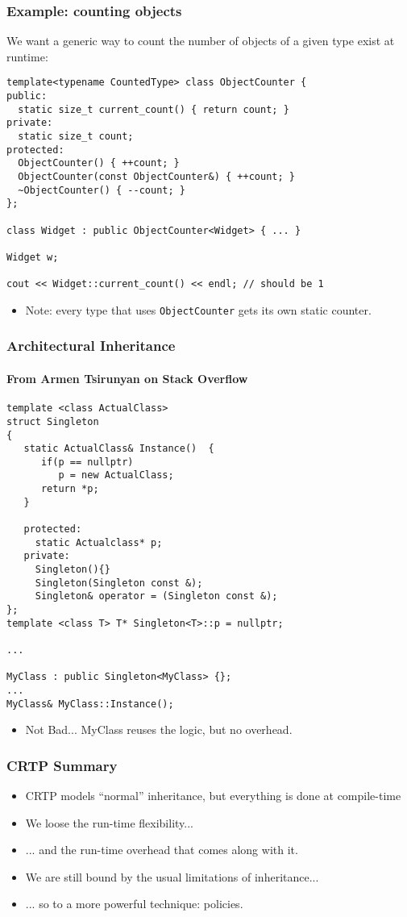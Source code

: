 \begin{frame}[fragile,t]
\frametitle{Example: counting objects}
We want a generic way to count the number of objects of a given type
exist at runtime:
{\scriptsize\begin{verbatim}
template<typename CountedType> class ObjectCounter {
public:
  static size_t current_count() { return count; }
private:
  static size_t count;
protected:
  ObjectCounter() { ++count; }
  ObjectCounter(const ObjectCounter&) { ++count; }
  ~ObjectCounter() { --count; }
};

class Widget : public ObjectCounter<Widget> { ... }

Widget w;

cout << Widget::current_count() << endl; // should be 1

\end{verbatim}
}
\begin{itemize}[<+->]
\item Note: every type that uses \texttt{ObjectCounter} gets its own
  static counter.
\end{itemize}
\end{frame}


\begin{frame}[fragile,t]
\frametitle{Architectural Inheritance}
\framesubtitle{From Armen Tsirunyan on Stack Overflow}
{\scriptsize\begin{verbatim}
template <class ActualClass> 
struct Singleton
{
   static ActualClass& Instance()  {
      if(p == nullptr)
         p = new ActualClass;
      return *p; 
   }

   protected:
     static Actualclass* p;
   private:
     Singleton(){}
     Singleton(Singleton const &);
     Singleton& operator = (Singleton const &); 
};
template <class T> T* Singleton<T>::p = nullptr;

...

MyClass : public Singleton<MyClass> {};
...
MyClass& MyClass::Instance();
\end{verbatim}
}
\begin{itemize}[<+->]
\item Not Bad... MyClass reuses the logic, but no overhead.
\end{itemize}

\end{frame}

\begin{frame}[fragile,t]
\frametitle{CRTP Summary}
\begin{itemize}[<+->]
\item CRTP models ``normal'' inheritance, but everything is done at compile-time
\item We loose the run-time flexibility...
\item ... and the run-time overhead that comes along with it.
\item We are still bound by the usual limitations of inheritance...
\item ... so to a more powerful technique: policies.
\end{itemize}
\end{frame}
